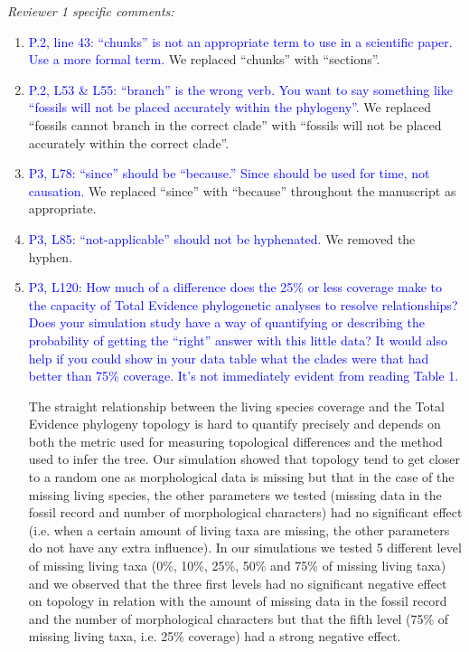 \documentclass[12pt,letterpaper]{article}
\renewcommand{\subsection}[1]{%
\bigskip
\begin{center}
\begin{large}
\normalfont\itshape #1
\end{large}
\end{center}}
\begin{document}
\subsection{Reviewer 1 specific comments:}
\begin{enumerate}
\item{\textcolor{blue}{P.2, line 43: ``chunks'' is not an appropriate term to use in a scientific paper. Use a more formal term.}}
We replaced ``chunks'' with ``sections''.

\item{\textcolor{blue}{P.2, L53 \& L55: ``branch'' is the wrong verb. You want to say something like ``fossils will not be placed accurately within the phylogeny''.}}
We replaced ``fossils cannot branch in the correct clade'' with ``fossils will not be placed accurately within the correct clade''.

\item{\textcolor{blue}{P3, L78: ``since'' should be ``because.'' Since should be used for time, not causation.}}
We replaced ``since'' with ``because'' throughout the manuscript as appropriate.

\item{\textcolor{blue}{P3, L85: ``not-applicable'' should not be hyphenated.}}
We removed the hyphen.

\item{\textcolor{blue}{P3, L120: How much of a difference does the 25\% or less coverage make to the capacity of Total Evidence phylogenetic analyses to resolve relationships? Does your simulation study have a way of quantifying or describing the probability of getting the ``right'' answer with this little data? It would also help if you could show in your data table what the clades were that had better than 75\% coverage. It's not immediately evident from reading Table 1.}}

The straight relationship between the living species coverage and the Total Evidence phylogeny topology is hard to quantify precisely and depends on both the metric used for measuring topological differences and the method used to infer the tree.
Our simulation showed that topology tend to get closer to a random one as morphological data is missing but that in the case of the missing living species, the other parameters we tested (missing data in the fossil record and number of morphological characters) had no significant effect (i.e. when a certain amount of living taxa are missing, the other parameters do not have any extra influence).
In our simulations we tested 5 different level of missing living taxa (0\%, 10\%, 25\%, 50\% and 75\% of missing living taxa) and we observed that the three first levels had no significant negative effect on topology in relation with the amount of missing data in the fossil record and the number of morphological characters but that the fifth level (75\% of missing living taxa, i.e. 25\% coverage) had a strong negative effect.


\end{enumerate}
\end{document}
